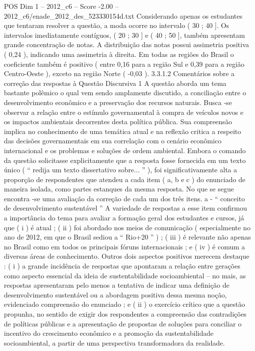 \begin{textsample}{POS Dim 1 – 2012\_c6 – Score -2.00 – 2012\_c6/enade\_2012\_des\_523330154d.txt}
Considerando apenas os estudantes que tentaram resolver a questão, a moda ocorre no intervalo ( 30 ; 40 ].
Os intervalos imediatamente contíguos, ( 20 ; 30 ] e ( 40 ; 50 ], também apresentam grande concentração de notas.
A distribuição das notas possui assimetria positiva ( 0,24 ), indicando uma assimetria à direita.
Em todas as regiões do Brasil o coeficiente também é positivo ( entre 0,16 para a região Sul e 0,39 para a região Centro-Oeste ), exceto na região Norte ( -0,03 ). 3.3.1.2 Comentários sobre a correção das respostas à Questão Discursiva 1 A questão aborda um tema bastante polêmico o qual vem sendo amplamente discutido, a conciliação entre o desenvolvimento econômico e a preservação dos recursos naturais.
Busca -se observar a relação entre o estímulo governamental à compra de veículos novos e os impactos ambientais decorrentes desta política pública.
Sua compreensão implica no conhecimento de uma temática atual e na reflexão critica a respeito das decisões governamentais em sua correlação com o cenário econômico internacional e os problemas e soluções de ordem ambiental.
Embora o comando da questão solicitasse explicitamente que a resposta fosse fornecida em um texto único ( “ redija um texto dissertativo sobre... ” ), foi significativamente alta a proporção de respondentes que atendeu a cada item ( a, b e c ) do enunciado de maneira isolada, como partes estanques da mesma resposta.
No que se segue encontra -se uma avaliação da correção de cada um dos três itens. a - “ conceito de desenvolvimento sustentável ” A variedade de respostas a esse item confirmou a importância do tema para avaliar a formação geral dos estudantes e cursos, já que ( i ) é atual ; ( ii ) foi abordado nos meios de comunicação ( especialmente no ano de 2012, em que o Brasil sediou a “ Rio+20 ” ) ; ( iii ) é relevante não apenas no Brasil como em todos os principais fóruns internacionais ; e ( iv ) é comum a diversas áreas de conhecimento.
Outros dois aspectos positivos merecem destaque : ( i ) a grande incidência de respostas que apontaram a relação entre gerações como aspecto essencial da ideia de sustentabilidade socioambiental – no mais, as respostas apresentaram pelo menos a tentativa de indicar uma definição de desenvolvimento sustentável ou a abordagem positiva dessa mesma noção, evidenciado compreensão do enunciado ; e ( ii ) o exercício crítico que a questão propunha, no sentido de exigir dos respondentes a compreensão das contradições de políticas públicas e a apresentação de propostas de soluções para conciliar o incentivo do crescimento econômico e a promoção da sustentabilidade socioambiental, a partir de uma perspectiva transformadora da realidade.

\end{textsample}
